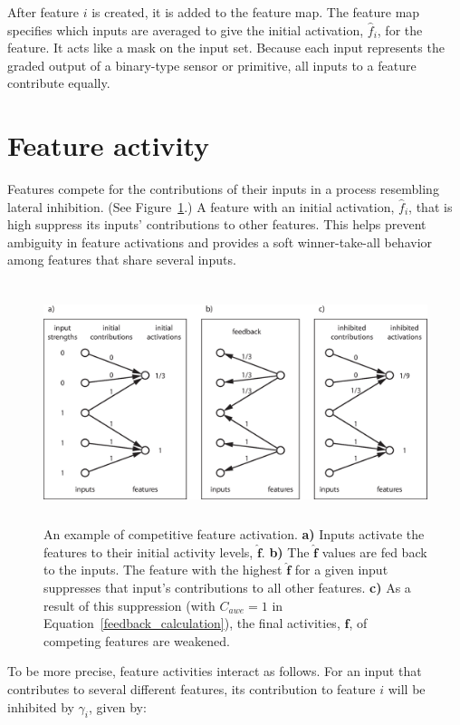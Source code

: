 After feature $i$ is created, it is added to the feature map. The feature map specifies which inputs are averaged to give the initial activation, $\hat{f}_i$, for the feature. It acts like a mask on the input set. Because each input represents the graded output of a binary-type sensor or primitive, all inputs to a feature contribute equally.

\section{Feature activity}

Features compete for the contributions of their inputs in a process resembling lateral inhibition. (See Figure~\ref{competitive_activation}.) A feature with an initial activation, $\hat{f}_i$, that is high suppress its inputs' contributions to other features. This helps prevent ambiguity in feature activations and provides a soft winner-take-all behavior among features that share several inputs.

\begin{figure}
\centering
\includegraphics[height=7cm]{figs/competitive_activation.eps}
\caption{An example of competitive feature activation. {\bf a)} Inputs activate the features to their initial activity levels, $\hat{\mathbf{f}}$. {\bf b)} The $\hat{\mathbf{f}}$ values are fed back to the inputs. The feature with the highest $\hat{\mathbf{f}}$ for a given input suppresses that input's contributions to all other features. {\bf c)} As a result of this suppression (with $C_{awe} = 1$ in Equation~\ref{feedback_calculation}), the final activities, $\mathbf{f}$, of competing features are weakened.}
\label{competitive_activation}
\end{figure}

To be more precise, feature activities interact as follows. For an input that contributes to several different features, its contribution to feature $i$ will be inhibited by $\gamma_i$, given by:


